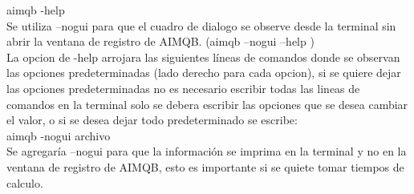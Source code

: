 \documentclass[a4paper,10pt]{article}
\begin{document}
aimqb -help\\

Se utiliza –nogui para que el cuadro de dialogo se observe desde la terminal sin abrir la ventana de registro de AIMQB. 
(aimqb –nogui –help )\\
La opcion de -help arrojara las siguientes líneas de comandos donde se observan las opciones predeterminadas 
(lado derecho para cada opcion), si se quiere dejar las opciones predeterminadas no es necesario escribir todas las lineas 
de comandos en la terminal solo se debera escribir las opciones que se desea cambiar el valor, o si se desea dejar todo 
predeterminado se escribe: \\

aimqb -nogui archivo  \\

Se agregaría –nogui para que la información se imprima en la terminal y no en la 
ventana de registro de AIMQB, esto es importante si se quiete tomar tiempos de calculo. \\
\end{document}
